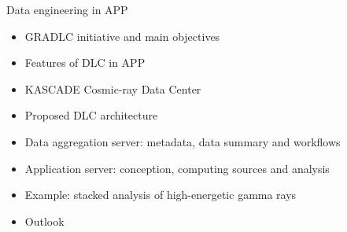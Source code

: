 \begin{frame}{Data engineering in APP}

\begin{minipage}[c]{0.52\textwidth}
\small
  \begin{itemize}
      \setlength{\itemsep}{0pt}
      \item  GRADLC initiative and main objectives
      \item  Features of DLC in APP
      \item  KASCADE Cosmic-ray Data Center
      \item  Proposed DLC architecture
      \item  Data aggregation server: metadata, data summary and workflows
      \item   Application server: conception, computing sources and analysis
      \item  Example: stacked analysis of high-energetic gamma rays
      \item  Outlook
  \end{itemize}
\end{minipage}
\hfill
\begin{minipage}[c]{0.47\textwidth}

\end{minipage}
\end{frame}
